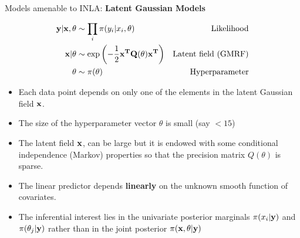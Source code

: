 \documentclass[
  ignorenonframetext,
]{beamer}
\providecommand{\tightlist}{%
  \setlength{\itemsep}{0pt}\setlength{\parskip}{0pt}}
\begin{document}
\begin{frame}{Models amenable to INLA: \textbf{Latent Gaussian Models}}
\protect\hypertarget{models-amenable-to-inla-latent-gaussian-models}{}
\small

\[
\begin{aligned}
\bf{y}|\bf{x},\bf{\theta} & \sim \prod_i\pi(y_i|x_i,\theta) & \text{Likelihood}\\
\bf{x}|\bf{\theta} & \sim \exp \left(-\frac{1}{2}\bf{x}^T\bf{Q}(\theta)\bf{x}^T \right)& \text{Latent field (GMRF)}\\
\bf{\theta} & \sim \pi(\theta) & \text{Hyperparameter}
\end{aligned}
\] \footnotesize

\begin{itemize}[<+->]
\tightlist
\item
  Each data point depends on only one of the elements in the latent
  Gaussian field \(\bf{x}\).
\end{itemize}

\begin{itemize}[<+->]
\tightlist
\item
  The size of the hyperparameter vector \(\theta\) is small (say
  \(<15\))
\end{itemize}

\begin{itemize}[<+->]
\tightlist
\item
  The latent field \(\bf{x}\), can be large but it is endowed with some
  conditional independence (Markov) properties so that the precision
  matrix \(Q(\theta)\) is sparse.
\end{itemize}

\begin{itemize}[<+->]
\tightlist
\item
  The linear predictor depends \textbf{linearly} on the unknown smooth
  function of covariates.
\end{itemize}

\begin{itemize}[<+->]
\tightlist
\item
  The inferential interest lies in the univariate posterior marginals
  \(\pi(x_i|\bf{y})\) and \(\pi(\theta_j|\bf{y})\) rather than in the
  joint posterior \(\pi(\bf{x}, \theta|\bf{y})\)
\end{itemize}

\normalsize
\end{frame}
\end{document}
